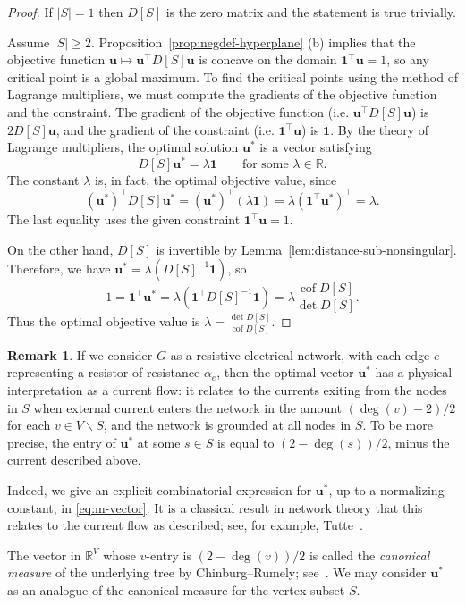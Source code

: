 \documentclass[12pt]{amsart}
\theoremstyle{definition}
\newtheorem{rmk}[thm]{Remark}
\newcommand{\RR}{\mathbb{R}}
\newcommand{\bone}{\mathbf{1}}
\newcommand{\boldu}{\mathbf{u}}
\newcommand{\tr}{\intercal}
\DeclareMathOperator{\cof}{cof}
\begin{document}
\begin{proof}
If $|S| = 1$ then $D[S]$ is the zero matrix and the statement is true trivially.

Assume $|S| \geq 2$.
Proposition~\ref{prop:negdef-hyperplane} (b) implies that 
the objective function $\boldu \mapsto \boldu^\tr D[S]\boldu$ is concave on the domain $\bone^\tr \boldu = 1$, so any critical point is a global maximum.
To find the critical points using the method of Lagrange multipliers, we must compute the gradients of the objective function and the constraint.
The gradient of the objective function (i.e. $\boldu^\tr D[S] \boldu$) is $2 D[S] \boldu$, 
and the gradient of the constraint (i.e. $\bone^\tr \boldu$) is $\bone$.
By the theory of Lagrange multipliers, the optimal solution $\boldu^*$ is a vector satisfying
\[
	D[S] \boldu^* = \lambda \bone \qquad\text{for some }\lambda \in \RR.
\]
The constant $\lambda$ is, in fact, the optimal objective value, since
\[
	(\boldu^*)^\tr D[S] \boldu^* = (\boldu^*)^\tr (\lambda \bone) = \lambda (\bone^\tr \boldu^*)^\tr = \lambda.
\]
The last equality uses the given constraint $\bone^\tr \boldu = 1$.

On the other hand,
 $D[S]$ is invertible by Lemma~\ref{lem:distance-sub-nonsingular}. Therefore, we have $ \boldu^* = \lambda (D[S]^{-1} \bone) $, so
\[
	1 = \bone^\tr \boldu^* = \lambda (\bone^\tr D[S]^{-1} \bone)
	= \lambda \frac{\cof D[S]}{\det D[S]}.
\]
Thus the optimal objective value is
$\displaystyle
	\lambda = \frac{\det D[S]}{\cof D[S]} .
$
\end{proof}

\begin{rmk}
	If we consider $G$ as a resistive electrical network, with each edge $e$ representing a resistor of resistance $\alpha_e$,
	then the optimal vector $\boldu^*$ has a physical interpretation as a current flow: 
	it relates to the currents exiting from the nodes in $S$ when external current enters the network in the amount $(\deg(v) - 2)/2$ for each $v \in V \backslash S$, 
	and the network is grounded at all nodes in $S$.
	To be more precise, the entry of $\boldu^*$ at some $s \in S$ is equal to $(2 - \deg(s)) / 2$, minus the current described above.

	Indeed, we give an explicit combinatorial expression for $\boldu^*$, up to a normalizing constant, in \eqref{eq:m-vector}. 
	It is a classical result in network theory that this relates to the current flow as described; 
	see, for example, Tutte~\cite[Section VI.6]{tutte}.

	The vector in $\RR^V$ whose $v$-entry is $(2 - \deg(v))/2$ is called the {\em canonical measure} of the underlying tree by Chinburg--Rumely; see~\cite[Section 14]{baker-rumely}.
	We may consider $\boldu^*$ as an analogue of the {canonical measure} for the vertex subset $S$.
\end{rmk}
\end{document}
